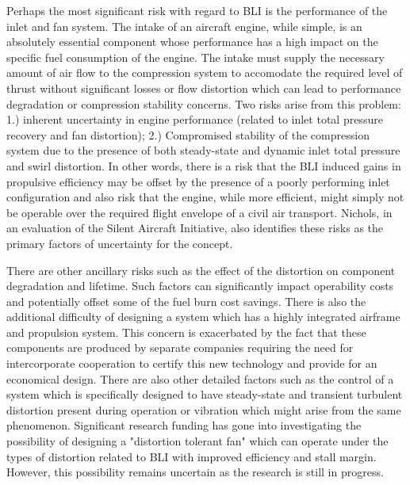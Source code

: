 Perhaps the most significant risk with regard to BLI is the performance of the inlet and fan system.  The intake of an aircraft engine, while simple, is an absolutely essential component whose performance has a high impact on the specific fuel consumption of the engine.  The intake must supply the necessary amount of air flow to the compression system to accomodate the required level of thrust without significant losses or flow distortion which can lead to performance degradation or compression stability concerns. Two risks arise from this problem: 1.) inherent uncertainty in engine performance (related to inlet total pressure recovery and fan distortion); 2.) Compromised stability of the compression system due to the presence of both steady-state and dynamic inlet total pressure and swirl distortion.  In other words, there is a risk that the BLI induced gains in propulsive efficiency may be offset by the presence of a poorly performing inlet configuration and also risk that the engine, while more efficient, might simply not be operable over the required flight envelope of a civil air transport. Nichols, in an evaluation of the Silent Aircraft Initiative, also identifies these risks as the primary factors of uncertainty for the concept.  

There are other ancillary risks such as the effect of the distortion on component degradation and lifetime. Such factors can significantly impact operability costs and potentially offset some of the fuel burn cost savings. There is also the additional difficulty of designing a system which has a highly integrated airframe and propulsion system. This concern is exacerbated by the fact that these components are produced by separate companies requiring the need for intercorporate cooperation to certify this new technology and provide for an economical design. There are also other detailed factors such as the control of a system which is specifically designed to have steady-state and transient turbulent distortion present during operation or vibration which might arise from the same phenomenon. Significant research funding has gone into investigating the possibility of designing a "distortion tolerant fan" which can operate under the types of distortion related to BLI with improved efficiency and stall margin. However, this possibility remains uncertain as the research is still in progress.


